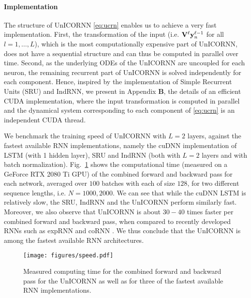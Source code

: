 \documentclass{article}
\newcommand{\by}{{\bf y}}
\newcommand{\bV}{{\bf V}}
\newcommand{\fref}[1] {Fig.~\ref{#1}}
\begin{document}
\paragraph{Implementation}
The structure of UnICORNN \eqref{eq:ucrn} enables us to achieve a very fast implementation. First, the transformation of the input (i.e. $\bV^\ell \by_n^{\ell-1}$ for all $l=1,\dots,L$), which is the most computationally expensive part of UnICORNN, does not have a sequential structure and can thus be computed in parallel over time. Second, as the underlying ODEs of the UnICORNN are uncoupled for each neuron, the remaining recurrent part of UnICORNN is solved independently for each component. Hence, inspired by the implementation of Simple Recurrent Units (SRU) \citep{sru} and IndRNN, we present in Appendix {\bf B}, the details of an efficient CUDA implementation, where the input transformation is computed in parallel and the dynamical system corresponding to each component of \eqref{eq:ucrn} is an independent CUDA thread. 

We benchmark the training speed of UnICORNN with $L=2$ layers, against the fastest available RNN implementations, namely the cuDNN implementation \citep{cudnn_lstm} of LSTM (with 1 hidden layer), SRU and IndRNN (both with $L=2$ layers and with batch normalization). \fref{fig:speed} shows the computational time (measured on a GeForce RTX 2080 Ti GPU) of the combined forward and backward pass for each network, averaged over $100$ batches with each of size $128$, for two different sequence lengths, i.e. $N=1000,2000$. We can see that while the cuDNN LSTM is relatively slow, the SRU, IndRNN and the UnICORNN perform similarly fast. Moreover, we also observe that UnICORNN is about $30-40$ times faster per combined forward and backward pass, when compared to recently developed RNNs such as expRNN \cite{exprnn} and coRNN \cite{coRNN}. We thus conclude that the UnICORNN is among the fastest available RNN architectures.

\begin{figure}[ht]
\vskip 0.2in
\begin{center}
\centerline{\texttt{[image: figures/speed.pdf]}}
\caption{Measured computing time for the combined forward and backward pass for the UnICORNN as well as for three of the fastest available RNN implementations.}
\label{fig:speed}
\end{center}
\vskip -0.2in
\end{figure}
\end{document}
